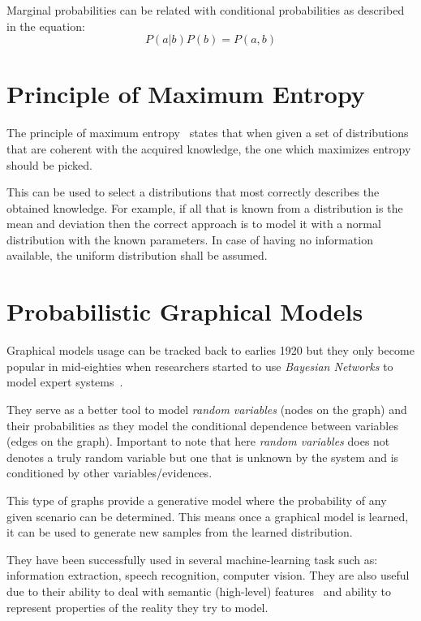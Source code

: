 Marginal probabilities can be related with conditional probabilities as described in the equation:
\begin{equation}
P(a|b) P(b)  = P(a, b)
\end{equation}


\section{Principle of Maximum Entropy}
\label{sec:max-entropy}
The principle of maximum entropy~\cite{shore1980axiomatic} states that when given
a set of distributions that are coherent with the acquired knowledge, the one which
maximizes entropy should be picked.

This can be used to select a distributions that most correctly describes the obtained
knowledge. For example, if all that is known from a distribution is the mean and deviation
then the correct approach is to model it with a normal distribution with the known parameters.
In case of having no information available, the uniform distribution shall be assumed.


\section{Probabilistic Graphical Models}
\label{sec:graphical-models}
Graphical models usage can be tracked back to earlies 1920 but they only become
popular in mid-eighties when researchers started to use \emph{Bayesian Networks}
to model expert systems~\citep{borgelt2002graphical}.

They serve as a better tool to model \emph{random variables}
(nodes on the graph) and their probabilities as they model the conditional
dependence between variables (edges on the graph). Important to note that here
\emph{random variables} does not denotes a truly random variable but one that is
unknown by the system and is conditioned by other variables/evidences.

This type of graphs provide a generative model where the probability of any
given scenario can be determined.
This means once a graphical model is learned, it can be used to generate new
samples from the learned distribution.

They have been successfully used in several machine-learning task such as:
information extraction, speech recognition, computer vision.
They are also useful due to their ability to deal with semantic (high-level)
features~\citep{boutell2006factor} and ability to represent properties of the
reality they try to model.

